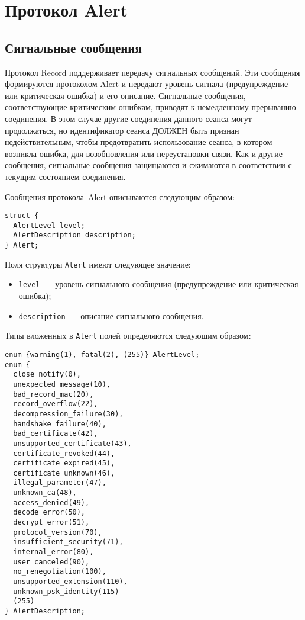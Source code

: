 \chapter{Протокол Alert}\label{ALERT}

\section{Сигнальные сообщения}\label{ALERT.1}

Протокол Record поддерживает передачу сигнальных сообщений. 
Эти сообщения формируются протоколом Alert и передают уровень 
сигнала (предупреждение или критическая ошибка) и его описание. 
Сигнальные сообщения, соответствующие критическим ошибкам, приводят к 
немедленному прерыванию соединения. В этом случае другие соединения 
данного сеанса могут продолжаться, но идентификатор сеанса ДОЛЖЕН быть 
признан недействительным, чтобы предотвратить использование сеанса, в 
котором возникла ошибка, для возобновления или переустановки связи. 
Как и другие сообщения, сигнальные сообщения защищаются и сжимаются в 
соответствии с текущим состоянием соединения. 

Сообщения протокола~Alert описываются следующим образом:
\begin{lstlisting}
struct {
  AlertLevel level;
  AlertDescription description;
} Alert;
\end{lstlisting}

Поля структуры \lstinline{Alert} имеют следующее значение:
\begin{itemize}
\item[--]
\lstinline{level}~--- уровень сигнального сообщения (предупреждение или 
критическая ошибка); 

\item[--]
\lstinline{description}~--- описание сигнального сообщения.
\end{itemize}

Типы вложенных в \lstinline{Alert} полей определяются следующим образом:
\begin{lstlisting}
enum {warning(1), fatal(2), (255)} AlertLevel;
enum {
  close_notify(0),
  unexpected_message(10),
  bad_record_mac(20),
  record_overflow(22),
  decompression_failure(30),
  handshake_failure(40),
  bad_certificate(42),
  unsupported_certificate(43),
  certificate_revoked(44),
  certificate_expired(45),
  certificate_unknown(46),
  illegal_parameter(47),
  unknown_ca(48),
  access_denied(49),
  decode_error(50),
  decrypt_error(51),
  protocol_version(70),
  insufficient_security(71),
  internal_error(80),
  user_canceled(90),
  no_renegotiation(100),
  unsupported_extension(110),
  unknown_psk_identity(115)
  (255)
} AlertDescription;
\end{lstlisting}

